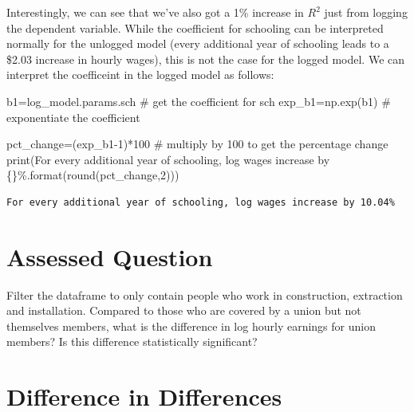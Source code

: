 \documentclass[
  letterpaper,
  DIV=11,
  numbers=noendperiod]{scrreprt}
\newenvironment{Shaded}{\begin{snugshade}}{\end{snugshade}}
\newcommand{\BuiltInTok}[1]{\textcolor[rgb]{0.00,0.23,0.31}{#1}}
\newcommand{\CommentTok}[1]{\textcolor[rgb]{0.37,0.37,0.37}{#1}}
\newcommand{\DecValTok}[1]{\textcolor[rgb]{0.68,0.00,0.00}{#1}}
\newcommand{\NormalTok}[1]{\textcolor[rgb]{0.00,0.23,0.31}{#1}}
\newcommand{\OperatorTok}[1]{\textcolor[rgb]{0.37,0.37,0.37}{#1}}
\newcommand{\SpecialCharTok}[1]{\textcolor[rgb]{0.37,0.37,0.37}{#1}}
\newcommand{\StringTok}[1]{\textcolor[rgb]{0.13,0.47,0.30}{#1}}
\begin{document}
Interestingly, we can see that we've also got a 1\% increase in \(R^2\)
just from logging the dependent variable. While the coefficient for
schooling can be interpreted normally for the unlogged model (every
additional year of schooling leads to a \$2.03 increase in hourly
wages), this is not the case for the logged model. We can interpret the
coefficeint in the logged model as follows:

\begin{Shaded}
\begin{Highlighting}[]
\NormalTok{b1}\OperatorTok{=}\NormalTok{log\_model.params.sch }\CommentTok{\# get the coefficient for sch}
\NormalTok{exp\_b1}\OperatorTok{=}\NormalTok{np.exp(b1) }\CommentTok{\# exponentiate the coefficient}

\NormalTok{pct\_change}\OperatorTok{=}\NormalTok{(exp\_b1}\OperatorTok{{-}}\DecValTok{1}\NormalTok{)}\OperatorTok{*}\DecValTok{100} \CommentTok{\# multiply by 100 to get the percentage change}
\BuiltInTok{print}\NormalTok{(}\StringTok{\textquotesingle{}For every additional year of schooling, log wages increase by }\SpecialCharTok{\{\}}\StringTok{\%\textquotesingle{}}\NormalTok{.}\BuiltInTok{format}\NormalTok{(}\BuiltInTok{round}\NormalTok{(pct\_change,}\DecValTok{2}\NormalTok{)))}
\end{Highlighting}
\end{Shaded}

\begin{verbatim}
For every additional year of schooling, log wages increase by 10.04%
\end{verbatim}


\hypertarget{assessed-question-6}{%
\chapter{Assessed Question}\label{assessed-question-6}}

Filter the dataframe to only contain people who work in construction,
extraction and installation. Compared to those who are covered by a
union but not themselves members, what is the difference in log hourly
earnings for union members? Is this difference statistically
significant?


\hypertarget{difference-in-differences}{%
\chapter{Difference in Differences}\label{difference-in-differences}}
\end{document}
